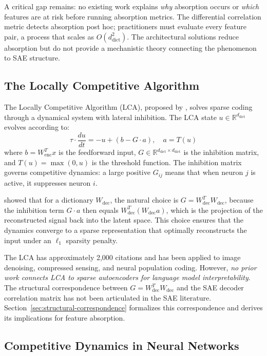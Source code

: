 \documentclass{article}
\begin{document}
A critical gap remains: no existing work explains \textit{why} absorption occurs or \textit{which} features are at risk before running absorption metrics. The differential correlation metric detects absorption post hoc; practitioners must evaluate every feature pair, a process that scales as $O(d_{\text{dict}}^2)$. The architectural solutions reduce absorption but do not provide a mechanistic theory connecting the phenomenon to SAE structure.

\subsection{The Locally Competitive Algorithm}
\label{sec:lca}

The Locally Competitive Algorithm (LCA), proposed by \citet{rozell2008sparse}, solves sparse coding through a dynamical system with lateral inhibition. The LCA state $u \in \mathbb{R}^{d_{\text{dict}}}$ evolves according to:
\begin{equation}
\tau \cdot \frac{du}{dt} = -u + (b - G \cdot a), \quad a = T(u)
\end{equation}
where $b = W_{\text{enc}}^T x$ is the feedforward input, $G \in \mathbb{R}^{d_{\text{dict}} \times d_{\text{dict}}}$ is the inhibition matrix, and $T(u) = \max(0, u)$ is the threshold function. The inhibition matrix governs competitive dynamics: a large positive $G_{ij}$ means that when neuron $j$ is active, it suppresses neuron $i$.

\citet{rozell2008sparse} showed that for a dictionary $W_{\text{dec}}$, the natural choice is $G = W_{\text{dec}}^T W_{\text{dec}}$, because the inhibition term $G \cdot a$ then equals $W_{\text{dec}}^T (W_{\text{dec}} a)$, which is the projection of the reconstructed signal back into the latent space. This choice ensures that the dynamics converge to a sparse representation that optimally reconstructs the input under an $\ell_1$ sparsity penalty.

The LCA has approximately 2,000 citations and has been applied to image denoising, compressed sensing, and neural population coding. However, \textit{no prior work connects LCA to sparse autoencoders for language model interpretability}. The structural correspondence between $G = W_{\text{dec}}^T W_{\text{dec}}$ and the SAE decoder correlation matrix has not been articulated in the SAE literature. Section~\ref{sec:structural-correspondence} formalizes this correspondence and derives its implications for feature absorption.

\subsection{Competitive Dynamics in Neural Networks}
\end{document}
